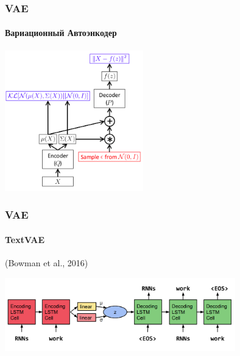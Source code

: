 \documentclass[10pt]{beamer}
\begin{document}
\begin{frame}
\frametitle{VAE}
\framesubtitle{Вариационный Автоэнкодер}

\begin{center}
    \includegraphics[width=0.45\textwidth]{images/vae_terms.png}
\end{center}

\end{frame}
\begin{frame}
\frametitle{VAE}
\framesubtitle{TextVAE}

(Bowman et al., 2016)

\begin{center}
    \includegraphics[width=0.75\textwidth]{images/text_vae.png}
\end{center}

\end{frame}
\end{document}

